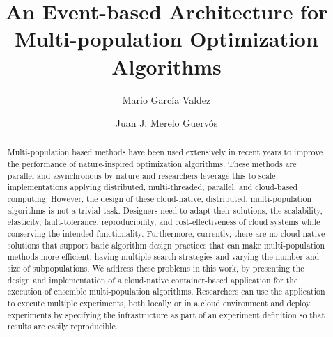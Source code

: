 \documentclass[review]{elsarticle}
\begin{document}
\begin{frontmatter}

\title{An Event-based Architecture for Multi-population Optimization Algorithms}

\author[itt]{Mario Garc\'ia Valdez}

\author[granada]{Juan J. Merelo Guerv\'os}

\address[itt]{Department of Graduate Studies, Instituto Tecnol\'ogico de Tijuana, Tijuana BC, Mexico}
\address[granada]{Universidad de Granada, Granada, Spain}

\begin{abstract} 
Multi-population based methods have been used extensively in
recent years to improve the performance of nature-inspired optimization
algorithms. These methods are parallel and asynchronous by nature and researchers
leverage this to scale implementations 
applying distributed, multi-threaded, parallel, and cloud-based computing. 
However, the design  of these cloud-native,  
distributed, multi-population algorithms is not a trivial task. Designers need
to adapt their solutions, 
the scalability, elasticity, fault-tolerance, reproducibility, and
cost-effectiveness of cloud systems while conserving the intended functionality.
Furthermore, currently, there are no
cloud-native solutions that support basic algorithm design practices that can make
multi-population methods more efficient: having multiple search strategies and
varying the number and size of subpopulations. We address these problems in this work,
by presenting the design and implementation of a cloud-native 
container-based %
application for the execution of ensemble multi-population algorithms. Researchers can
use the application to execute multiple experiments, both locally or in a cloud
environment and deploy experiments by specifying the infrastructure as part of
an experiment definition so that results are easily reproducible.

\end{abstract}
\end{frontmatter}
\end{document}
